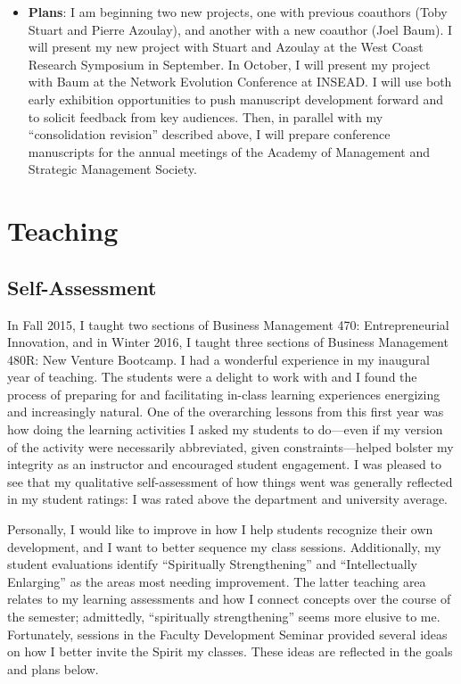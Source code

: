 \documentclass[11pt,article,oneside]{memoir}
\begin{document}
\begin{itemize}
  \begin{itemize}
  \tightlist
  \item
    \textbf{Plans}: I am beginning two new projects, one with previous
    coauthors (Toby Stuart and Pierre Azoulay), and another with a new
    coauthor (Joel Baum). I will present my new project with Stuart and
    Azoulay at the West Coast Research Symposium in September. In
    October, I will present my project with Baum at the Network
    Evolution Conference at INSEAD. I will use both early exhibition
    opportunities to push manuscript development forward and to solicit
    feedback from key audiences. Then, in parallel with my
    \enquote{consolidation revision} described above, I will prepare
    conference manuscripts for the annual meetings of the Academy of
    Management and Strategic Management Society.
  \end{itemize}
\end{itemize}

\section{Teaching}\label{teaching}

\subsection{Self-Assessment}\label{self-assessment-1}

In Fall 2015, I taught two sections of Business Management 470:
Entrepreneurial Innovation, and in Winter 2016, I taught three sections
of Business Management 480R: New Venture Bootcamp. I had a wonderful
experience in my inaugural year of teaching. The students were a delight
to work with and I found the process of preparing for and facilitating
in-class learning experiences energizing and increasingly natural. One
of the overarching lessons from this first year was how doing the
learning activities I asked my students to do---even if my version of
the activity were necessarily abbreviated, given constraints---helped
bolster my integrity as an instructor and encouraged student engagement.
I was pleased to see that my qualitative self-assessment of how things
went was generally reflected in my student ratings: I was rated above
the department and university average.

Personally, I would like to improve in how I help students recognize
their own development, and I want to better sequence my class sessions.
Additionally, my student evaluations identify \enquote{Spiritually
Strengthening} and \enquote{Intellectually Enlarging} as the areas most
needing improvement. The latter teaching area relates to my learning
assessments and how I connect concepts over the course of the semester;
admittedly, \enquote{spiritually strengthening} seems more elusive to
me. Fortunately, sessions in the Faculty Development Seminar provided
several ideas on how I better invite the Spirit my classes. These ideas
are reflected in the goals and plans below.
\end{document}
